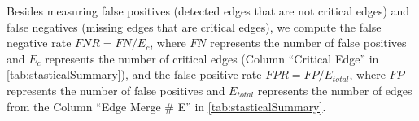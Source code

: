 Besides measuring false positives (detected edges that are not critical edges) and false negatives (missing edges that are critical edges), we compute the false negative rate $FNR = FN / E_{c}$, where $FN$ represents the number of false positives and $E_{c}$ represents the number of critical edges (Column ``Critical Edge'' in \cref{tab:stasticalSummary}),
and the false positive rate $FPR = FP/E_{total}$, where $FP$ represents the number of false positives and $E_{total}$ represents the number of edges from the Column ``Edge Merge \# E'' in \cref{tab:stasticalSummary}.





















